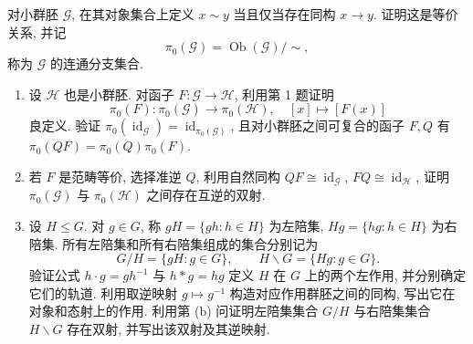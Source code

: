 \documentclass{article}
\begin{document}
\begin{problem}
对小群胚 $\mathcal G$, 在其对象集合上定义 $x\sim y$ 当且仅当存在同构 $x\to y$. 证明这是等价关系, 并记
\[
  \pi_0(\mathcal G)=\operatorname{Ob}(\mathcal G)/{\sim},
\]
称为 $\mathcal G$ 的连通分支集合.
\begin{enumerate}
  \item[(a)] 设 $\mathcal H$ 也是小群胚. 对函子 $F:\mathcal G\to\mathcal H$, 利用第 1 题证明
  \[
    \pi_0(F):\pi_0(\mathcal G)\longrightarrow\pi_0(\mathcal H),\quad [x]\longmapsto[F(x)]
  \]
  良定义. 验证 $\pi_0(\operatorname{id}_{\mathcal G})=\operatorname{id}_{\pi_0(\mathcal G)}$, 且对小群胚之间可复合的函子 $F,Q$ 有 $\pi_0(QF)=\pi_0(Q)\pi_0(F)$.
  \item[(b)] 若 $F$ 是范畴等价, 选择准逆 $Q$, 利用自然同构 $QF\cong\operatorname{id}_{\mathcal G}$, $FQ\cong\operatorname{id}_{\mathcal H}$, 证明 $\pi_0(\mathcal G)$ 与 $\pi_0(\mathcal H)$ 之间存在互逆的双射.
  \item[(c)] 设 $H\le G$. 对 $g\in G$, 称 $gH=\{gh:h\in H\}$ 为左陪集, $Hg=\{hg:h\in H\}$ 为右陪集. 所有左陪集和所有右陪集组成的集合分别记为
  \[
    G/H=\{gH:g\in G\},\qquad H\backslash G=\{Hg:g\in G\}.
  \]
  验证公式 $h\cdot g=gh^{-1}$ 与 $h*g=hg$ 定义 $H$ 在 $G$ 上的两个左作用, 并分别确定它们的轨道. 利用取逆映射 $g\mapsto g^{-1}$ 构造对应作用群胚之间的同构, 写出它在对象和态射上的作用. 利用第 (b) 问证明左陪集集合 $G/H$ 与右陪集集合 $H\backslash G$ 存在双射, 并写出该双射及其逆映射.
\end{enumerate}
\end{problem}
\end{document}
